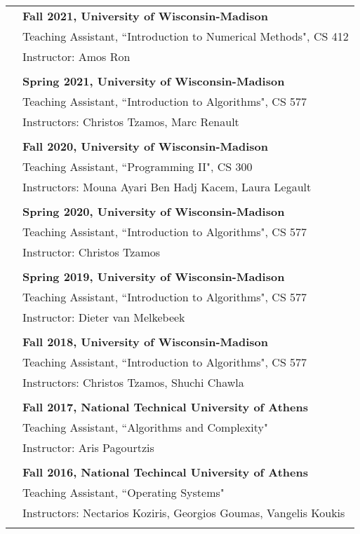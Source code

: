 \documentclass[letterpaper,11pt,oneside]{article}
\begin{document}
\begin{longtable}{@{} l l}
  & \textbf{Fall 2021, University of Wisconsin-Madison} \\
  & Teaching Assistant, ``Introduction to Numerical Methods", CS 412\\
  & Instructor: Amos Ron\\
  & \\

  & \textbf{Spring 2021, University of Wisconsin-Madison} \\
  & Teaching Assistant, ``Introduction to Algorithms", CS 577 \\
  & Instructors: Christos Tzamos, Marc Renault \\
  & \\

  & \textbf{Fall 2020, University of Wisconsin-Madison} \\
  & Teaching Assistant, ``Programming II", CS 300 \\
  & Instructors: Mouna Ayari Ben Hadj Kacem, Laura Legault \\
  & \\

  & \textbf{Spring 2020, University of Wisconsin-Madison} \\
  & Teaching Assistant, ``Introduction to Algorithms", CS 577 \\
  & Instructor: Christos Tzamos \\
  & \\

& \textbf{Spring 2019, University of Wisconsin-Madison} \\
& Teaching Assistant, ``Introduction to Algorithms", CS 577 \\
& Instructor: Dieter van Melkebeek \\
& \\

&\textbf{Fall 2018, University of Wisconsin-Madison} \\
& Teaching Assistant, ``Introduction to Algorithms", CS 577 \\
& Instructors: Christos Tzamos, Shuchi Chawla \\
& \\

&\textbf{Fall 2017, National Technical University of Athens} \\
& Teaching Assistant, ``Algorithms and Complexity" \\
& Instructor: Aris Pagourtzis \\
& \\

&\textbf{Fall 2016, National Techincal University of Athens} \\
& Teaching Assistant, ``Operating Systems" \\
& Instructors: Nectarios Koziris, Georgios Goumas, Vangelis Koukis\\
& \\


\end{longtable}
\end{document}
